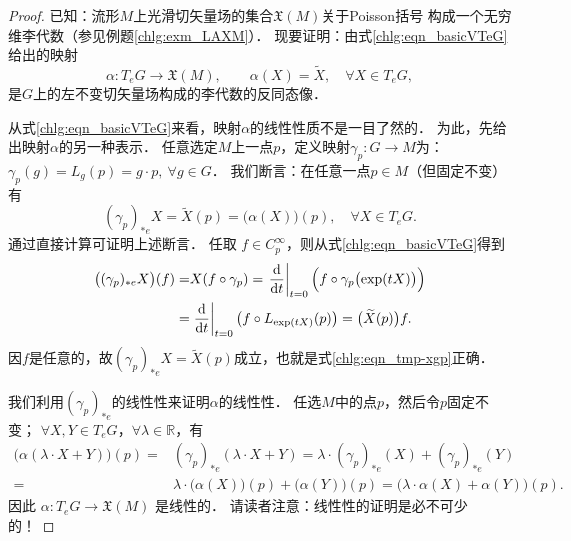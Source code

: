 \begin{proof}
    已知：流形$M$上光滑切矢量场的集合$\mathfrak{X}(M)$关于Poisson括号
    构成一个无穷维李代数（参见例题\ref{chlg:exm_LAXM}）．
    现要证明：由式\eqref{chlg:eqn_basicVTeG}给出的映射
    \begin{equation}
        \alpha: T_e G \rightarrow \mathfrak{X}(M),\qquad
        \alpha(X)=\widetilde{X}, \quad \forall X \in T_e G,
    \end{equation}
    是$G$上的左不变切矢量场构成的李代数的反同态像．
    
    从式\eqref{chlg:eqn_basicVTeG}来看，映射$\alpha$的线性性质不是一目了然的．
    为此，先给出映射$\alpha$的另一种表示．
    任意选定$M$上一点$p$，定义映射$\gamma_p: G \rightarrow M$为：
    $\gamma_p(g)=L_g(p)=g\cdot p, \ \forall g \in G $．
    我们断言：在任意一点$p \in M$（但固定不变）有
    \begin{equation}\label{chlg:eqn_tmp-xgp}
        (\gamma_p)_{*e} X =\widetilde{X}(p)=\bigl(\alpha(X)\bigr)(p), \quad \forall X \in T_e G .
    \end{equation}
    通过直接计算可证明上述断言．
    任取 $f \in C_p^{\infty}$，则从式\eqref{chlg:eqn_basicVTeG}得到
    \begin{align*}
        \bigl((\gamma_p)_{*e} X\bigr)(f)=& X(f \circ \gamma_p) 
        = \left.\frac{\mathrm{d}}{\mathrm{d} t}\right|_{t=0} \Bigl(f \circ \gamma_p\bigl(\exp (t X)\bigr)\Bigr) \\
        = & \left.\frac{\mathrm{d}}{\mathrm{d} t}\right|_{t=0}\left(f \circ L_{\exp (t  X)}(p)\right) 
        =  \bigl(\widetilde{X}(p)\bigr) f.
    \end{align*}
    因$f$是任意的，故$(\gamma_p)_{*e} X=\widetilde{X}(p)$成立，也就是式\eqref{chlg:eqn_tmp-xgp}正确．
    
    我们利用$(\gamma_p)_{*e}$的线性性来证明$\alpha$的线性性．
    任选$M$中的点$p$，然后令$p$固定不变；
    $\forall X, Y \in T_e G$，$\forall \lambda \in \mathbb{R}$，有
    \begin{align*}
        \bigl(\alpha(\lambda \cdot X+Y)\bigr)(p)=& (\gamma_p)_{*e}(\lambda \cdot X+Y) 
        =  \lambda \cdot (\gamma_p)_{*e}(X)+(\gamma_p)_{*e}(Y) \\
        = & \lambda \cdot \bigl(\alpha(X)\bigr)(p)+\bigl(\alpha(Y)\bigr)(p) 
        =  \bigl(\lambda \cdot \alpha(X)+\alpha(Y)\bigr)(p). 
    \end{align*}
    因此 $\alpha: T_e G \rightarrow \mathfrak{X}(M)$ 是线性的．
    请读者注意：线性性的证明是必不可少的！
    

\end{proof}
